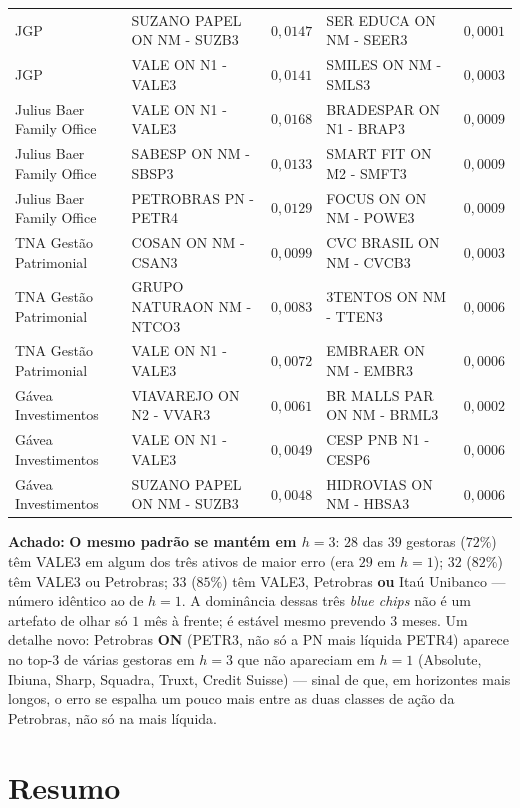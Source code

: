 \documentclass[11pt,a4paper]{article}
\newcommand{\aha}[1]{\par\vspace{4pt}\noindent\textbf{\color{vermelho}Achado:} #1\par\vspace{2pt}}
\begin{document}
\begin{center}
\begin{longtable}{@{}lp{3.9cm}rp{3.9cm}r@{}}
JGP & SUZANO PAPEL ON NM - SUZB3 & $0{,}0147$ & SER EDUCA ON NM - SEER3 & $0{,}0001$ \\
JGP & VALE ON N1 - VALE3 & $0{,}0141$ & SMILES ON NM - SMLS3 & $0{,}0003$ \\
Julius Baer Family Office & VALE ON N1 - VALE3 & $0{,}0168$ & BRADESPAR ON N1 - BRAP3 & $0{,}0009$ \\
Julius Baer Family Office & SABESP ON NM - SBSP3 & $0{,}0133$ & SMART FIT ON M2 - SMFT3 & $0{,}0009$ \\
Julius Baer Family Office & PETROBRAS PN - PETR4 & $0{,}0129$ & FOCUS ON ON NM - POWE3 & $0{,}0009$ \\
TNA Gestão Patrimonial & COSAN ON NM - CSAN3 & $0{,}0099$ & CVC BRASIL ON NM - CVCB3 & $0{,}0003$ \\
TNA Gestão Patrimonial & GRUPO NATURAON NM - NTCO3 & $0{,}0083$ & 3TENTOS ON NM - TTEN3 & $0{,}0006$ \\
TNA Gestão Patrimonial & VALE ON N1 - VALE3 & $0{,}0072$ & EMBRAER ON NM - EMBR3 & $0{,}0006$ \\
Gávea Investimentos & VIAVAREJO ON N2 - VVAR3 & $0{,}0061$ & BR MALLS PAR ON NM - BRML3 & $0{,}0002$ \\
Gávea Investimentos & VALE ON N1 - VALE3 & $0{,}0049$ & CESP PNB N1 - CESP6 & $0{,}0006$ \\
Gávea Investimentos & SUZANO PAPEL ON NM - SUZB3 & $0{,}0048$ & HIDROVIAS ON NM - HBSA3 & $0{,}0006$ \\
\end{longtable}
\end{center}

\aha{\textbf{O mesmo padrão se mantém em $h{=}3$}: $28$ das $39$ gestoras ($72\%$) têm VALE3
em algum dos três ativos de maior erro (era $29$ em $h{=}1$); $32$ ($82\%$) têm VALE3 ou
Petrobras; $33$ ($85\%$) têm VALE3, Petrobras \textbf{ou} Itaú Unibanco --- número idêntico ao de
$h{=}1$. A dominância dessas três \emph{blue chips} não é um artefato de olhar só $1$ mês à
frente; é estável mesmo prevendo $3$ meses. Um detalhe novo: Petrobras \textbf{ON} (PETR3, não só
a PN mais líquida PETR4) aparece no top-3 de várias gestoras em $h{=}3$ que não apareciam em
$h{=}1$ (Absolute, Ibiuna, Sharp, Squadra, Truxt, Credit Suisse) --- sinal de que, em horizontes
mais longos, o erro se espalha um pouco mais entre as duas classes de ação da Petrobras, não só
na mais líquida.}

\FloatBarrier
\section{Resumo}
\end{document}
